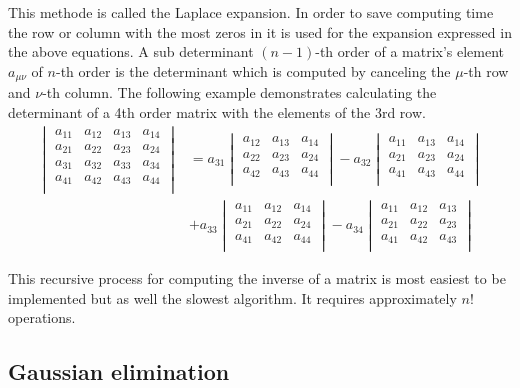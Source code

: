 \documentclass[10pt]{report}
\begin{document}
This methode is called the Laplace expansion.  In order to save
computing time the row or column with the most zeros in it is used for
the expansion expressed in the above equations.  A sub determinant
$(n-1)$-th order of a matrix's element $a_{\mu\nu}$ of $n$-th order is
the determinant which is computed by canceling the $\mu$-th row and
$\nu$-th column.  The following example demonstrates calculating the
determinant of a 4th order matrix with the elements of the 3rd row.
\begin{align}
\begin{vmatrix}
a_{11} & a_{12} & a_{13} & a_{14}\\
a_{21} & a_{22} & a_{23} & a_{24}\\
a_{31} & a_{32} & a_{33} & a_{34}\\
a_{41} & a_{42} & a_{43} & a_{44}\\
\end{vmatrix}
&= a_{31}
\begin{vmatrix}
a_{12} & a_{13} & a_{14}\\
a_{22} & a_{23} & a_{24}\\
a_{42} & a_{43} & a_{44}\\
\end{vmatrix}
- a_{32}
\begin{vmatrix}
a_{11} & a_{13} & a_{14}\\
a_{21} & a_{23} & a_{24}\\
a_{41} & a_{43} & a_{44}\\
\end{vmatrix}\\
\nonumber
&+ a_{33}
\begin{vmatrix}
a_{11} & a_{12} & a_{14}\\
a_{21} & a_{22} & a_{24}\\
a_{41} & a_{42} & a_{44}\\
\end{vmatrix}
- a_{34}
\begin{vmatrix}
a_{11} & a_{12} & a_{13}\\
a_{21} & a_{22} & a_{23}\\
a_{41} & a_{42} & a_{43}\\
\end{vmatrix}
\end{align}

This recursive process for computing the inverse of a matrix is most
easiest to be implemented but as well the slowest algorithm.  It
requires approximately $n!$ operations.

\subsection{Gaussian elimination}
\end{document}
